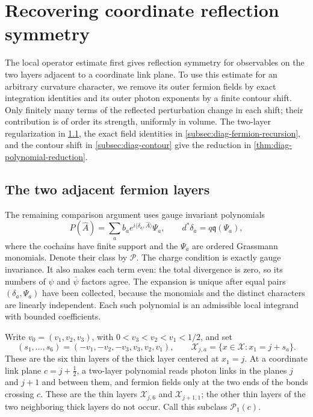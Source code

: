 \section{Recovering coordinate reflection symmetry}\label{sec:coordinate-symmetry}

The local operator estimate first gives reflection symmetry for
observables on the two layers adjacent to a coordinate link plane.
To use this estimate for an arbitrary curvature character, we remove
its outer fermion fields by exact integration identities and its
outer photon exponents by a finite contour shift. Only finitely many
terms of the reflected perturbation change in each shift; their
contribution is of order its strength, uniformly in volume. The
two-layer regularization in \cref{subsec:diag-two-layers}, the exact
field identities in \cref{subsec:diag-fermion-recursion}, and the
contour shift in \cref{subsec:diag-contour} give the reduction in
\cref{thm:diag-polynomial-reduction}.

\subsection{The two adjacent fermion layers}\label{subsec:diag-two-layers}

The remaining comparison argument uses gauge invariant polynomials
\[
 P(\widehat A)=\sum_a b_a e^{i\langle\delta_a,\widehat A\rangle}
                                     \Psi_a,\qquad
 d^*\delta_a=q\mathfrak q(\Psi_a),
\]
where the cochains have finite support and the $\Psi_a$ are ordered
Grassmann monomials. Denote their class by $\mathcal P$. The charge
condition is exactly gauge invariance. It also makes each term
even: the total divergence is zero, so its numbers of $\psi$ and
$\bar\psi$ factors agree. The expansion is unique after equal
pairs $(\delta_a,\Psi_a)$ have been collected, because the monomials
and the distinct characters are linearly independent. Each such
polynomial is an admissible local integrand with bounded coefficients.

Write $v_0=(v_1,v_2,v_3)$, with $0<v_3<v_2<v_1<1/2$, and set
\[
 (s_1,\ldots,s_6)=(-v_1,-v_2,-v_3,v_3,v_2,v_1),\qquad
 \mathcal X_{j,a}=\{x\in\mathcal X:x_1=j+s_a\}.
\]
These are the six thin layers of the thick layer centered at $x_1=j$.
At a coordinate link plane $c=j+\tfrac12$, a two-layer polynomial
reads photon links in the planes $j$ and $j+1$ and between them,
and fermion fields only at the two ends of the bonds crossing
$c$. These are the thin layers $\mathcal X_{j,6}$ and
$\mathcal X_{j+1,1}$; the other thin layers of the two neighboring thick layers do
not occur. Call this subclass $\mathcal P_1(c)$.

